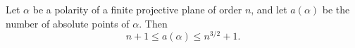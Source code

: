Let $\alpha$ be a polarity of a finite projective plane of order $n$, and let $a(\alpha)$ be the number of absolute points of $\alpha$. Then
$$n+1 \leq a(\alpha) \leq n^{3/2}+1.$$
